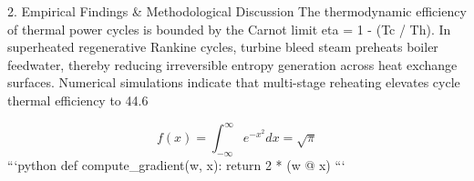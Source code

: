 2. Empirical Findings & Methodological Discussion
The thermodynamic efficiency of thermal power cycles is bounded by the Carnot limit eta = 1 - (Tc / Th). In superheated regenerative Rankine cycles, turbine bleed steam preheats boiler feedwater, thereby reducing irreversible entropy generation across heat exchange surfaces. Numerical simulations indicate that multi-stage reheating elevates cycle thermal efficiency to 44.6%

$$ f(x) = \int_{-\infty}^{\infty} e^{-x^2} dx = \sqrt{\pi} $$ 
```python
def compute_gradient(w, x):
    return 2 * (w @ x)
```